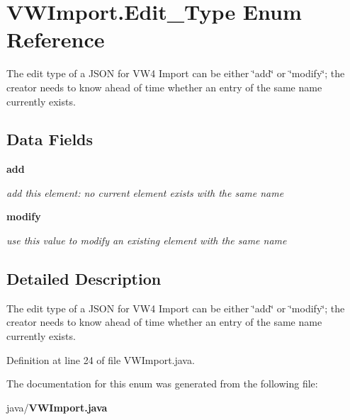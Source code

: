 \section{V\-W\-Import.\-Edit\-\_\-\-Type Enum Reference}
\label{enumorg_1_1smallfoot_1_1vw4_1_1VWImport_1_1Edit__Type}


The edit type of a J\-S\-O\-N for V\-W4 Import can be either \char`\"{}add\char`\"{} or \char`\"{}modify\char`\"{}; the creator needs to know ahead of time whether an entry of the same name currently exists.  


\subsection*{Data Fields}
\begin{DoxyCompactItemize}
\item 
{\bf add}\label{enumorg_1_1smallfoot_1_1vw4_1_1VWImport_1_1Edit__Type_a393e4cd5187ecf30d2db2129a73f3c05}

\begin{DoxyCompactList}\small\item\em add this element\-: no current element exists with the same name \end{DoxyCompactList}\item 
{\bf modify}\label{enumorg_1_1smallfoot_1_1vw4_1_1VWImport_1_1Edit__Type_afa21b51665d4dc82669bba18a62d8b58}

\begin{DoxyCompactList}\small\item\em use this value to modify an existing element with the same name \end{DoxyCompactList}\end{DoxyCompactItemize}


\subsection{Detailed Description}
The edit type of a J\-S\-O\-N for V\-W4 Import can be either \char`\"{}add\char`\"{} or \char`\"{}modify\char`\"{}; the creator needs to know ahead of time whether an entry of the same name currently exists. 

Definition at line 24 of file V\-W\-Import.\-java.



The documentation for this enum was generated from the following file\-:\begin{DoxyCompactItemize}
\item 
java/{\bf V\-W\-Import.\-java}\end{DoxyCompactItemize}
